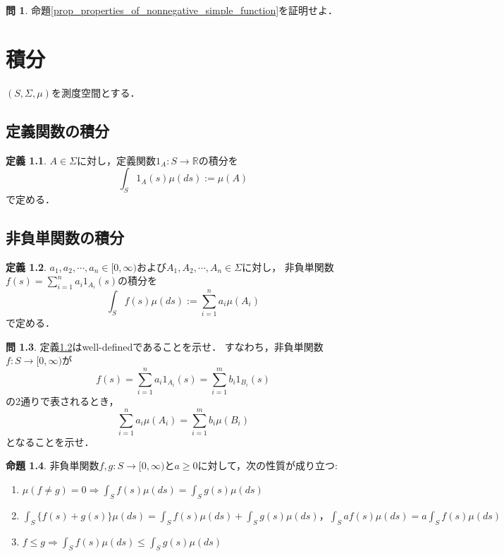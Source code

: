 \documentclass{jsreport}
\theoremstyle{definition}
\newtheorem{defi}{定義}[section]
\newtheorem{prop}[defi]{命題}
\newtheorem{qst}[defi]{問}
\begin{document}
\begin{qst}\label{qst_proof_of_properties_of_nonnegative_simple_function}
命題\ref{prop_properties_of_nonnegative_simple_function}を証明せよ．
\end{qst}

\chapter{積分}

$(S,\Sigma,\mu)$を測度空間とする．

\section{定義関数の積分}

\begin{defi}\label{def_indicator_function_integral}
$A\in\Sigma$に対し，定義関数$1_A \colon S\to\mathbb{R}$の積分を
\[ \int_S 1_A(s)\mu(ds):=\mu(A) \]
で定める．
\end{defi}

\section{非負単関数の積分}

\begin{defi}\label{def_nonnegative_simple_function_integral}
$a_1,a_2,\cdots,a_n\in[0,\infty)$および$A_1,A_2,\cdots,A_n\in\Sigma$に対し，
非負単関数$f(s)=\displaystyle\sum_{i=1}^n a_i1_{A_i}(s)$の積分を
\[ \int_S f(s)\mu(ds):=\sum_{i=1}^n a_i\mu(A_i) \]
で定める．
\end{defi}

\begin{qst}\label{qst_simple_function_integral}
定義\ref{def_nonnegative_simple_function_integral}はwell-definedであることを示せ．
すなわち，非負単関数$f \colon S\to[0,\infty)$が
\[ f(s)=\sum_{i=1}^n a_i1_{A_i}(s)=\sum_{i=1}^m b_i1_{B_i}(s) \]
の2通りで表されるとき，
\[ \sum_{i=1}^n a_i\mu(A_i)=\sum_{i=1}^m b_i\mu(B_i) \]
となることを示せ．
\end{qst}

\begin{prop}\label{prop_properties_of_simple_function_integral}
非負単関数$f,g \colon S\to[0,\infty)$と$a\geq0$に対して，次の性質が成り立つ:
\begin{enumerate}
\item$\mu(f \neq g)=0\Rightarrow\displaystyle\int_S f(s)\mu(ds)=\int_S g(s)\mu(ds)$
\item$\displaystyle\int_S \{f(s)+g(s)\}\mu(ds)=\int_S f(s)\mu(ds)+\int_S g(s)\mu(ds)，
\int_S af(s)\mu(ds)=a\int_S f(s)\mu(ds)$
\item$f \leq g\Rightarrow\displaystyle\int_S f(s)\mu(ds)\leq\int_S g(s)\mu(ds)$
\end{enumerate}
\end{prop}
\end{document}
